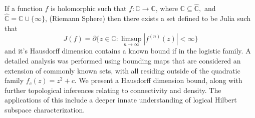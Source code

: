  If a function \(f\) is holomorphic such that \( f: \mathbb{C} \rightarrow \mathbb{C}\), where $\mathbb{C} \subseteq \hat{\mathbb{C}},$ and $\hat{\mathbb{C}} = \mathbb{C} \cup \{\infty\}$, (Riemann Sphere) then there exists a set defined to be Julia such that \[ J(f) = \partial\{z \in \mathbb{C} : \limsup_{n \to \infty}|f^{(n)}(z)| < \infty \}\] and it's Hausdorff dimension contains a known bound if in the logistic family. A detailed analysis was performed using bounding maps that are considered an extension of commonly known sets, with all residing outside of the quadratic family $f_c(z) = z^2 + c$. We present a Hausdorff dimension bound, along with further topological inferences relating to connectivity and density.   The applications of this include a deeper innate understanding of logical Hilbert subspace characterization.
